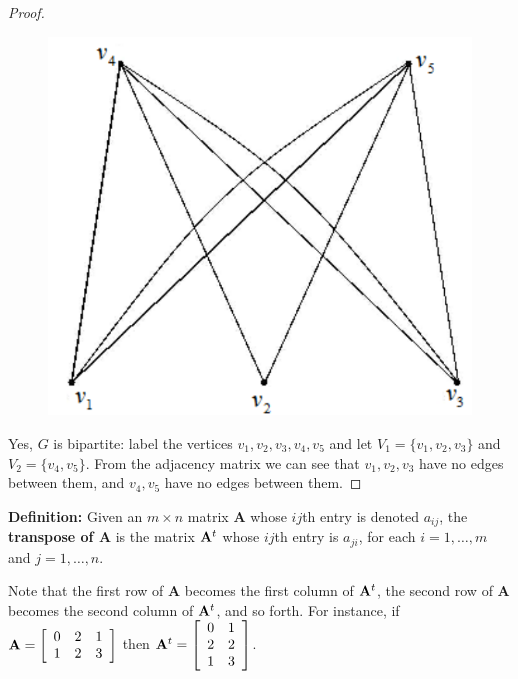 \documentclass[14pt]{extarticle}
\newcommand{\cy}{\color{cyan}}
\begin{document}
\begin{proof}
\begin{figure}[ht!]
\centering
\includegraphics[scale=0.2]{../images/10.2.22.a.png}
\end{figure}

Yes, \(G\) is bipartite: label the vertices \(v_1, v_2, v_3, v_4, v_5\) and let \(V_1 = \{v_1, v_2, v_3\}\) and \(V_2 = 
\{v_4, v_5\}\). From the adjacency matrix we can see that \(v_1, v_2, v_3\) have no edges between them, and \(v_4, v_5\)
have no edges between them.
\end{proof}

\begin{tcolorbox}[colframe=cyan]
{\bf \cy Definition:} Given an \(m \times n\) matrix {\bf A} whose \(ij\)th entry is denoted \(a_{ij}\), the {\bf transpose 
of A} is the matrix \({\bf A}^t\) whose \(ij\)th entry is \(a_{ji}\), for each \(i = 1, \ldots, m\) and \(j = 1, \ldots, n\).
\end{tcolorbox}

Note that the first row of {\bf A} becomes the first column of \({\bf A}^t\), the second row of {\bf A} becomes the second 
column of \({\bf A}^t\), and so forth. For instance, if
\({\bf A} = 
\left[ 
\begin{array}{rrr}
0 & 2 & 1 \\
1 & 2 & 3 \\
\end{array}
\right]
\) 
then
\({\bf A}^t = 
\left[ 
\begin{array}{rr}
0 & 1 \\
2 & 2 \\
1 & 3 \\
\end{array}
\right]
\).
\end{document}
